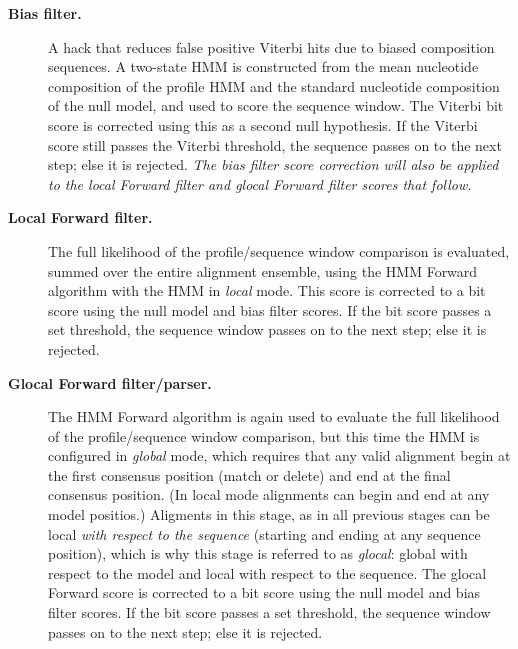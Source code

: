 \begin{description}
\begin{description}
\item[\textbf{Bias filter.}] A hack that reduces false positive
  Viterbi hits due to biased composition sequences. A two-state HMM is
  constructed from the mean nucleotide composition of the profile HMM
  and the standard nucleotide composition of the null model, and used
  to score the sequence window. The Viterbi bit score is corrected
  using this as a second null hypothesis. If the Viterbi score still
  passes the Viterbi threshold, the sequence passes on to the next
  step; else it is rejected. \emph{The bias filter score correction
  will also be applied to the local Forward filter and glocal Forward
  filter scores that follow.}
  
\item[\textbf{Local Forward filter.}] The full likelihood of
  the profile/sequence window comparison is evaluated, summed over the
  entire alignment ensemble, using the HMM Forward algorithm with the
  HMM in \emph{local} mode. This score is corrected to a bit score using the
  null model and bias filter scores. If the bit score passes a set
  threshold, the sequence window passes on to the next step; else it
  is rejected.

\item[\textbf{Glocal Forward filter/parser.}]  The HMM Forward
  algorithm is again used to evaluate the full likelihood of the
  profile/sequence window comparison, but this time the HMM is
  configured in \emph{global} mode, which requires that any valid
  alignment begin at the first consensus position (match or delete)
  and end at the final consensus position. (In local mode alignments
  can begin and end at any model positios.) Aligments in this stage,
  as in all previous stages can be local \emph{with respect to the
  sequence} (starting and ending at any sequence position), which is
  why this stage is referred to as \emph{glocal}: global with respect
  to the model and local with respect to the sequence. The glocal
  Forward score is corrected to a bit score using the null model and
  bias filter scores. If the bit score passes a set threshold, the
  sequence window passes on to the next step; else it is rejected.
  

\end{description}
\end{description}
